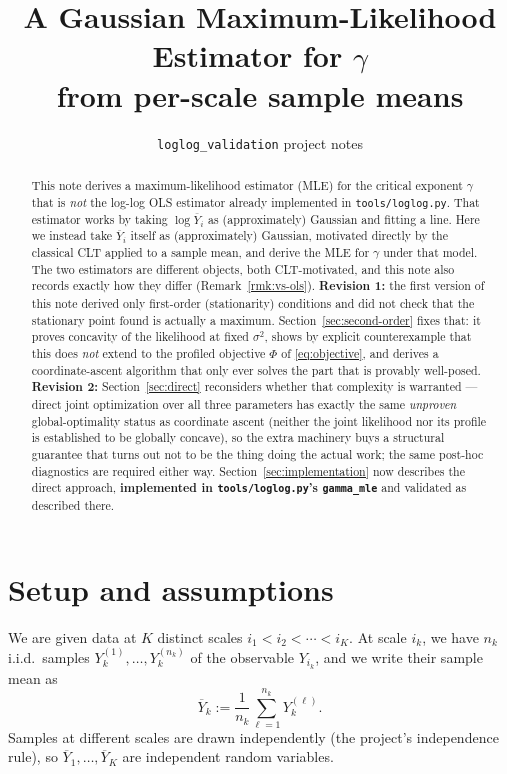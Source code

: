 \documentclass[11pt]{article}
\title{A Gaussian Maximum-Likelihood Estimator for $\gamma$\\
\large from per-scale sample means}
\author{\texttt{loglog\_validation} project notes}
\date{}
\begin{document}
\maketitle

\begin{abstract}
\noindent
This note derives a maximum-likelihood estimator (MLE) for the critical
exponent $\gamma$ that is \emph{not} the log-log OLS estimator already
implemented in \texttt{tools/loglog.py}. That estimator works by taking
$\log \overline{Y}_i$ as (approximately) Gaussian and fitting a line. Here we
instead take $\overline{Y}_i$ itself as (approximately) Gaussian, motivated
directly by the classical CLT applied to a sample mean, and derive the MLE for
$\gamma$ under that model. The two estimators are different objects, both
CLT-motivated, and this note also records exactly how they differ
(Remark~\ref{rmk:vs-ols}). \textbf{Revision 1:} the first version of this
note derived only first-order (stationarity) conditions and did not check
that the stationary point found is actually a maximum. Section~\ref{sec:second-order}
fixes that: it proves concavity of the likelihood at fixed $\sigma^2$, shows
by explicit counterexample that this does \emph{not} extend to the profiled
objective $\Phi$ of \eqref{eq:objective}, and derives a coordinate-ascent
algorithm that only ever solves the part that is provably well-posed.
\textbf{Revision 2:} Section~\ref{sec:direct} reconsiders whether that
complexity is warranted --- direct joint optimization over all three
parameters has exactly the same \emph{unproven} global-optimality status as
coordinate ascent (neither the joint likelihood nor its profile is
established to be globally concave), so the extra machinery buys a
structural guarantee that turns out not to be the thing doing the actual
work; the same post-hoc diagnostics are required either way. Section~\ref{sec:implementation}
now describes the direct approach, \textbf{implemented in
\texttt{tools/loglog.py}'s \texttt{gamma\_mle}} and validated as described
there.
\end{abstract}

\section{Setup and assumptions}

We are given data at $K$ distinct scales $i_1 < i_2 < \cdots < i_K$. At scale
$i_k$, we have $n_k$ i.i.d.\ samples $Y_k^{(1)}, \dots, Y_k^{(n_k)}$ of the
observable $Y_{i_k}$, and we write their sample mean as
\[
  \overline{Y}_k := \frac{1}{n_k}\sum_{\ell=1}^{n_k} Y_k^{(\ell)}.
\]
Samples at different scales are drawn independently (the project's
independence rule), so $\overline{Y}_1, \dots, \overline{Y}_K$ are independent
random variables.
\end{document}
